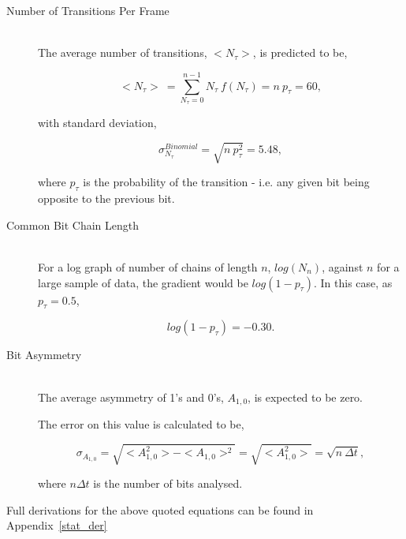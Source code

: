 			\begin{description}
				\item[Number of Transitions Per Frame] \hfill \\
					
					The average number of transitions, $<N_\tau>$, is predicted to be,

					\begin{equation}
						<N_\tau> \ = \sum_{N_{\tau}=0}^{n-1} N_{\tau}\ f(N_{\tau}) = n\ p_{\tau} = 60,
						\label{eqn:tansition_expectation}
					\end{equation}

					with standard deviation,

					\begin{equation}
						\sigma_{N_\tau}^{Binomial} = \sqrt{ n\ p_{\tau}^2} = 5.48,
					\end{equation}

					where $p_\tau$ is the probability of the transition - i.e. any given bit being opposite to the previous bit.

				\item[Common Bit Chain Length] \hfill \\

					For a log graph of number of chains of length $n$, $log(N_n)$, against $n$ for a large sample of data, the gradient would be $log(1 - p_\tau)$.
					In this case, as $p_\tau = 0.5$, 

					\begin{equation}
						log(1 - p_\tau) = -0.30.
						\label{eqn:log_chain_length_gradient}			
					\end{equation}

				\item[Bit Asymmetry] \hfill \\

					The average asymmetry of 1's and 0's, $A_{1,0}$, is expected to be zero.

					The error on this value is calculated to be,

					\begin{equation}
						\sigma_{A_{1,0}} = \sqrt{<A_{1,0}^2> - <A_{1,0}>^2} = \sqrt{<A_{1,0}^2>} = \sqrt{n\ \Delta t},
					\end{equation}

					where $n \Delta t$ is the number of bits analysed. 

			\end{description}	

			Full derivations for the above quoted equations can be found in Appendix~\ref{stat_der}

